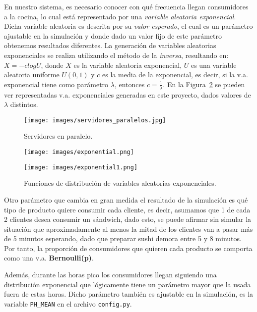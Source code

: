 \documentclass[a4paper, 10pt]{article}
\begin{document}
	En nuestro sistema, es necesario conocer con qué frecuencia llegan consumidores a la cocina,
	lo cual está representado por una {\itshape variable aleatoria exponencial}. Dicha variable aleatoria
	es descrita por su {\itshape valor esperado}, el cual es un parámetro ajustable en la simulación
	y donde dado un valor fijo de este parámetro obtenemos resultados diferentes. La generación de
	variables aleatorias exponenciales se realiza utilizando el método de la {\itshape inversa},
	resultando en: $X = -clogU$, donde $X$ es la variable aleatoria exponencial, $U$ es 
	una variable aleatoria uniforme $U(0, 1)$ y $c$ es la media de la exponencial, es decir,
	si la v.a. exponencial tiene como parámetro $\lambda$, entonces $c = \frac{1}{\lambda}$.
	En la Figura~\ref{fig:2} se pueden ver representadas v.a. exponenciales generadas en este proyecto,
	dados valores de $\lambda$ distintos.

	\begin{figure}[h]
		\begin{center}
			\texttt{[image: images/servidores\_paralelos.jpg]}			
		\end{center}
		\caption{Servidores en paralelo.}
		\label{fig:1}	
	\end{figure}	

	\begin{figure}[h]
		\begin{minipage}{.5\textwidth}
			\centering
			\texttt{[image: images/exponential.png]}			
		\end{minipage}
		\begin{minipage}{.5\textwidth}
			\centering
			\texttt{[image: images/exponential1.png]}			
		\end{minipage}		
		\caption{Funciones de distribución de variables aleatorias exponenciales.}
		\label{fig:2}	
	\end{figure}

	Otro parámetro que cambia en gran medida el resultado de la simulación es qué tipo de producto
	quiere consumir cada cliente, es decir, asumamos que 1 de cada 2 clientes desea consumir
	un sándwich, dado esto, se puede afirmar sin simular la situación que aproximadamente
	al menos la mitad de los clientes van a pasar más de 5 minutos esperando, dado que preparar
	sushi demora entre 5 y 8 minutos. Por tanto, la proporción de consumidores que quieren cada
	producto se comporta como una v.a. {\bfseries Bernoulli(p)}.

	Además, durante las horas pico los consumidores llegan siguiendo una distribución exponencial que
	lógicamente tiene un parámetro mayor que la usada fuera de estas horas. Dicho parámetro también es ajustable
	en la simulación, es la variable \verb!PH_MEAN! en el archivo \verb!config.py!.
\end{document}
